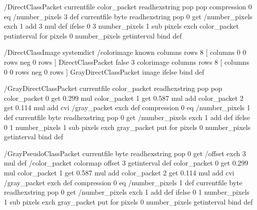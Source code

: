 

%
%
/DirectClassPacket
{
  currentfile color_packet readhexstring pop pop
  compression 0 eq
  {
    /number_pixels 3 def
  }
  {
    currentfile byte readhexstring pop 0 get
    /number_pixels exch 1 add 3 mul def
  } ifelse
  0 3 number_pixels 1 sub
  {
    pixels exch color_packet putinterval
  } for
  pixels 0 number_pixels getinterval
} bind def

/DirectClassImage
{
  systemdict /colorimage known
  {
    columns rows 8
    [
      columns 0 0
      rows neg 0 rows
    ]
    { DirectClassPacket } false 3 colorimage
  }
  {
    columns rows 8
    [
      columns 0 0
      rows neg 0 rows
    ]
    { GrayDirectClassPacket } image
  } ifelse
} bind def

/GrayDirectClassPacket
{
  currentfile color_packet readhexstring pop pop
  color_packet 0 get 0.299 mul
  color_packet 1 get 0.587 mul add
  color_packet 2 get 0.114 mul add
  cvi
  /gray_packet exch def
  compression 0 eq
  {
    /number_pixels 1 def
  }
  {
    currentfile byte readhexstring pop 0 get
    /number_pixels exch 1 add def
  } ifelse
  0 1 number_pixels 1 sub
  {
    pixels exch gray_packet put
  } for
  pixels 0 number_pixels getinterval
} bind def

/GrayPseudoClassPacket
{
  currentfile byte readhexstring pop 0 get
  /offset exch 3 mul def
  /color_packet colormap offset 3 getinterval def
  color_packet 0 get 0.299 mul
  color_packet 1 get 0.587 mul add
  color_packet 2 get 0.114 mul add
  cvi
  /gray_packet exch def
  compression 0 eq
  {
    /number_pixels 1 def
  }
  {
    currentfile byte readhexstring pop 0 get
    /number_pixels exch 1 add def
  } ifelse
  0 1 number_pixels 1 sub
  {
    pixels exch gray_packet put
  } for
  pixels 0 number_pixels getinterval
} bind def

